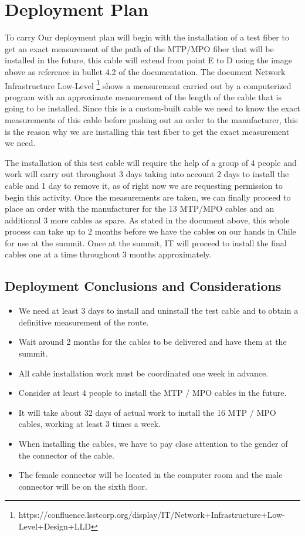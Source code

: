 \newpage

\section{Deployment Plan}

  To carry Our deployment plan will begin with the installation of a test fiber to get an exact measurement of the path of the MTP/MPO fiber that will be installed in the future, this cable will extend from point E to D using the image above as reference in bullet 4.2 of the documentation. The document Network Infrastructure Low-Level \footnote[1]{https://confluence.lsstcorp.org/display/IT/Network+Infrastructure+Low-Level+Design+LLD} shows a measurement carried out by a computerized program with an approximate measurement of the length of the cable that is going to be installed. Since this is a custom-built cable we need to know the exact measurements of this cable before pushing out an order to the manufacturer, this is the reason why we are installing this test fiber to get the exact measurement we need.

  The installation of this test cable will require the help of a group of 4 people and work will carry out throughout 3 days taking into account 2 days to install the cable and 1 day to remove it, as of right now we are requesting permission to begin this activity. Once the measurements are taken, we can finally proceed to place an order with the manufacturer for the 13 MTP/MPO cables and an additional 3 more cables as spare. As stated in the document above, this whole process can take up to 2 months before we have the cables on our hands in Chile for use at the summit. Once at the summit, IT will proceed to install the final cables one at a time throughout 3 months approximately.

\newpage

\subsection{Deployment Conclusions and Considerations}

\begin{itemize}
    \item We need at least 3 days to install and uninstall the test cable and to obtain a definitive measurement of the route.
    \item Wait around 2 months for the cables to be delivered and have them at the summit.
    \item All cable installation work must be coordinated one week in advance.
    \item Consider at least 4 people to install the MTP / MPO cables in the future.
    \item It will take about 32 days of actual work to install the 16 MTP / MPO cables, working at least 3 times a week.
    \item When installing the cables, we have to pay close attention to the gender of the connector of the cable.
    \item The female connector will be located in the computer room and the male connector will be on the sixth floor.
\end{itemize}

\newpage
